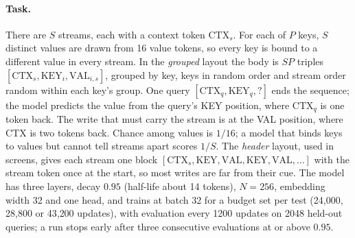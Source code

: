 \documentclass[11pt]{article}
\begin{document}
\paragraph{Task.} There are $S$ streams, each with a context token $\mathrm{CTX}_s$. For each of $P$ keys, $S$ distinct values are drawn from 16 value tokens, so every key is bound to a different value in every stream. In the \emph{grouped} layout the body is $S P$ triples $[\mathrm{CTX}_s, \mathrm{KEY}_i, \mathrm{VAL}_{i,s}]$, grouped by key, keys in random order and stream order random within each key's group. One query $[\mathrm{CTX}_q, \mathrm{KEY}_q, ?]$ ends the sequence; the model predicts the value from the query's KEY position, where $\mathrm{CTX}_q$ is one token back. The write that must carry the stream is at the VAL position, where CTX is two tokens back. Chance among values is $1/16$; a model that binds keys to values but cannot tell streams apart scores $1/S$. The \emph{header} layout, used in screens, gives each stream one block $[\mathrm{CTX}_s, \mathrm{KEY}, \mathrm{VAL}, \mathrm{KEY}, \mathrm{VAL}, \ldots]$ with the stream token once at the start, so most writes are far from their cue. The model has three layers, decay $0.95$ (half-life about 14 tokens), $N = 256$, embedding width 32 and one head, and trains at batch 32 for a budget set per test (24{,}000, 28{,}800 or 43{,}200 updates), with evaluation every 1200 updates on 2048 held-out queries; a run stops early after three consecutive evaluations at or above $0.95$.
\end{document}

